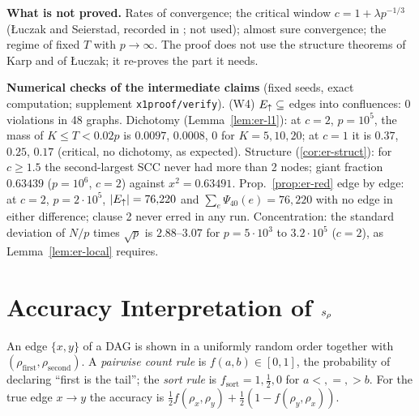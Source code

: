 \textbf{What is not proved.} Rates of convergence; the critical window
$c=1+\lambda p^{-1/3}$ (\L{}uczak and Seierstad, recorded in
\citealp{dovgal2020birth}; not used); almost sure convergence; the regime of
fixed $T$ with $p\to\infty$. The proof does not use the structure theorems of
Karp and of \L{}uczak; it re-proves the part it needs.

\textbf{Numerical checks of the intermediate claims} (fixed seeds, exact
computation; supplement \texttt{x1proof/verify}). (W4) $E_{\uparrow}\subseteq$ edges into
confluences: 0 violations in 48 graphs. Dichotomy (Lemma~\ref{lem:er-l1}): at
$c=2$, $p=10^5$, the mass of $K\le T<0.02p$ is $0.0097$, $0.0008$, $0$ for
$K=5,10,20$; at $c=1$ it is $0.37$, $0.25$, $0.17$ (critical, no dichotomy, as
expected). Structure (\cref{cor:er-struct}): for $c\ge1.5$ the second-largest
SCC never had more than 2 nodes; giant fraction $0.63439$ ($p=10^6$, $c=2$)
against $x^2=0.63491$. Prop.~\ref{prop:er-red} edge by edge: at $c=2$,
$p=2\cdot10^5$, $|E_{\uparrow}|=76{,}220$ and $\sum_e\Psi_{40}(e)=76{,}220$ with no edge
in either difference; clause 2 never erred in any run. Concentration: the
standard deviation of $N/p$ times $\sqrt p$ is $2.88$--$3.07$ for
$p=5\cdot10^3$ to $3.2\cdot10^5$ ($c=2$), as Lemma~\ref{lem:er-local} requires.

\section{Accuracy Interpretation of $s_\rho$}
\label{app:x3}

An edge $\{x,y\}$ of a DAG is shown in a uniformly random order together with
$(\rho_{\mathrm{first}},\rho_{\mathrm{second}})$. A \emph{pairwise count rule} is
$f(a,b)\in[0,1]$, the probability of declaring ``first is the tail''; the
\emph{sort rule} is $f_{\mathrm{sort}}=1,\tfrac12,0$ for $a<,=,>b$. For the true
edge $x\to y$ the accuracy is $\tfrac12f(\rho_x,\rho_y)+\tfrac12(1-f(\rho_y,\rho_x))$.

